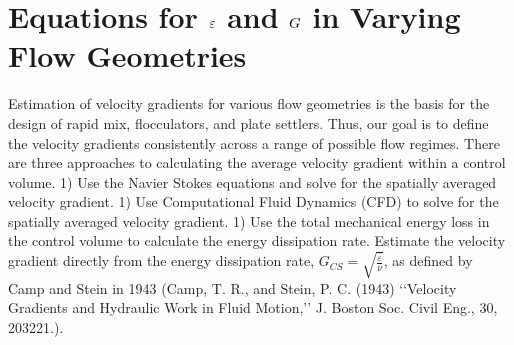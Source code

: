 \documentclass[letterpaper,10pt,english]{sphinxmanual}
\begin{document}
\section{Equations for \protect\(\varepsilon\protect\) and \protect\(G\protect\) in Varying Flow Geometries}
\label{\detokenize{Rapid_Mix/RM_Theory_and_Future_Work:equations-for-and-in-varying-flow-geometries}}\label{\detokenize{Rapid_Mix/RM_Theory_and_Future_Work:heading-equations-varying-flow-geometries}}
Estimation of velocity gradients for various flow geometries is the basis for the design of rapid mix, flocculators, and plate settlers. Thus, our goal is to define the velocity gradients consistently across a range of possible flow regimes. There are three approaches to calculating the average velocity gradient within a control volume. 1) Use the Navier Stokes equations and solve for the spatially averaged velocity gradient. 1) Use Computational Fluid Dynamics (CFD) to solve for the spatially averaged velocity gradient. 1) Use the total mechanical energy loss in the control volume to calculate the energy dissipation rate. Estimate the velocity gradient directly from the energy dissipation rate, \(G_{CS} = \sqrt{\frac{\bar\varepsilon}{\nu}}\), as defined by Camp and Stein in 1943 (Camp, T. R., and Stein, P. C. (1943) ‘‘Velocity Gradients and Hydraulic Work in Fluid Motion,’’ J. Boston Soc. Civil Eng., 30, 203\textendash{}221.).
\end{document}
